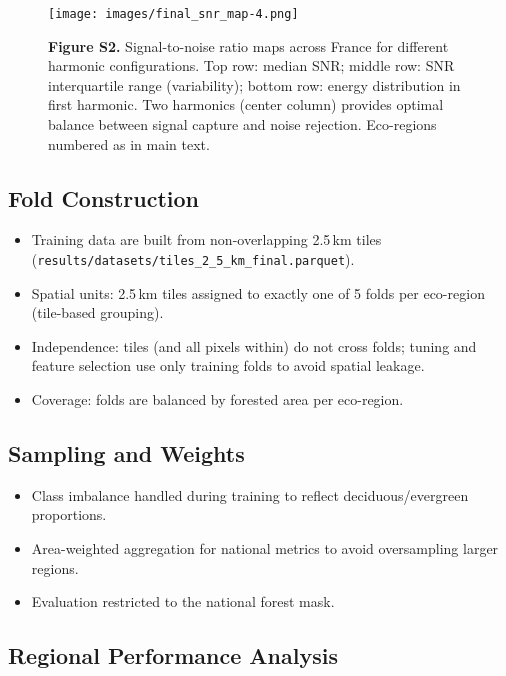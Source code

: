 \documentclass[utf8]{frontiers_suppmat}
\begin{document}
\begin{figure}[H]
    \centering
    \texttt{[image: images/final\_snr\_map-4.png]}
    \caption{\textbf{Figure S2.} Signal-to-noise ratio maps across France for different harmonic configurations. Top row: median SNR; middle row: SNR interquartile range (variability); bottom row: energy distribution in first harmonic. Two harmonics (center column) provides optimal balance between signal capture and noise rejection. Eco-regions numbered as in main text.}
    \label{fig:snr_maps}
\end{figure}



\subsection{Fold Construction}
\begin{itemize}
    \item Training data are built from non-overlapping 2.5\,km tiles (\texttt{results/datasets/tiles\_2\_5\_km\_final.parquet}).
    \item Spatial units: 2.5\,km tiles assigned to exactly one of 5 folds per eco-region (tile-based grouping).
    \item Independence: tiles (and all pixels within) do not cross folds; tuning and feature selection use only training folds to avoid spatial leakage.
    \item Coverage: folds are balanced by forested area per eco-region.
\end{itemize}

\subsection{Sampling and Weights}
\begin{itemize}
    \item Class imbalance handled during training to reflect deciduous/evergreen proportions.
    \item Area-weighted aggregation for national metrics to avoid oversampling larger regions.
    \item Evaluation restricted to the national forest mask.
\end{itemize}

\subsection{Regional Performance Analysis}
\end{document}
